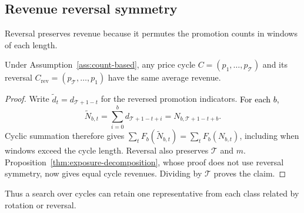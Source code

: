 \subsection{Revenue reversal symmetry}
\label{sec:reversal}
Reversal preserves revenue because it permutes the promotion counts in windows of each length.
\begin{proposition}\label{thm:reversal}
Under Assumption~\ref{ass:count-based}, any price cycle \(C=(p_1,\ldots,p_{\mathcal T})\) and its reversal \(C_{\mathrm{rev}}=(p_{\mathcal T},\ldots,p_1)\) have the same average revenue.
\end{proposition}
\begin{proof}
Write \(\widetilde d_t=d_{\mathcal T+1-t}\) for the reversed promotion indicators. \textcolor{black}{For each \(b\),}
\[
 \widetilde N_{b,t}=\sum_{i=0}^b d_{\mathcal T+1-t+i}
 =N_{b,\mathcal T+1-t+b}.
\]
Cyclic summation therefore gives
\(\sum_t F_b(\widetilde N_{b,t})=\sum_t F_b(N_{b,t})\), including when windows exceed the cycle length. Reversal also preserves \(\mathcal T\) and \(m\). Proposition~\ref{thm:exposure-decomposition}, whose proof does not use reversal symmetry, now gives equal cycle revenues. Dividing by \(\mathcal T\) proves the claim.
\end{proof}
Thus a search over cycles can retain one representative from each class related by rotation or reversal.
